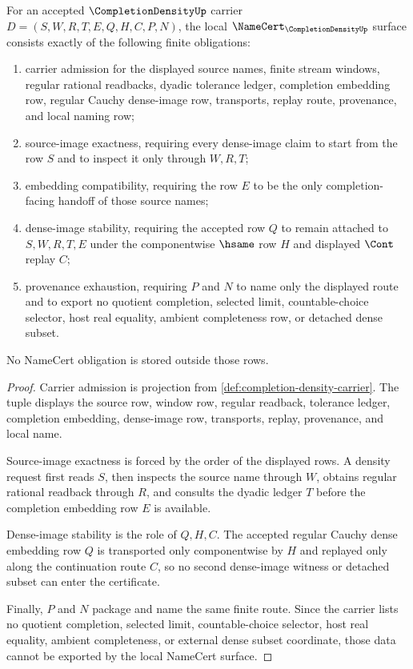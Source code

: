 \begin{theorem}
\label{thm:completion-density-namecert-obligations}
For an accepted $\CompletionDensityUp$ carrier $D=(S,W,R,T,E,Q,H,C,P,N)$, the local $\NameCert_{\CompletionDensityUp}$ surface consists exactly of the following finite obligations:
\begin{enumerate}
\item carrier admission for the displayed source names, finite stream windows, regular rational readbacks, dyadic tolerance ledger, completion embedding row, regular Cauchy dense-image row, transports, replay route, provenance, and local naming row;
\item source-image exactness, requiring every dense-image claim to start from the row $S$ and to inspect it only through $W,R,T$;
\item embedding compatibility, requiring the row $E$ to be the only completion-facing handoff of those source names;
\item dense-image stability, requiring the accepted row $Q$ to remain attached to $S,W,R,T,E$ under the componentwise $\hsame$ row $H$ and displayed $\Cont$ replay $C$;
\item provenance exhaustion, requiring $P$ and $N$ to name only the displayed route and to export no quotient completion, selected limit, countable-choice selector, host real equality, ambient completeness row, or detached dense subset.
\end{enumerate}
No NameCert obligation is stored outside those rows.
\end{theorem}
\begin{proof}
Carrier admission is projection from \autoref{def:completion-density-carrier}. The tuple displays the source row, window row, regular readback, tolerance ledger, completion embedding, dense-image row, transports, replay, provenance, and local name.

Source-image exactness is forced by the order of the displayed rows. A density request first reads $S$, then inspects the source name through $W$, obtains regular rational readback through $R$, and consults the dyadic ledger $T$ before the completion embedding row $E$ is available.

Dense-image stability is the role of $Q,H,C$. The accepted regular Cauchy dense embedding row $Q$ is transported only componentwise by $H$ and replayed only along the continuation route $C$, so no second dense-image witness or detached subset can enter the certificate.

Finally, $P$ and $N$ package and name the same finite route. Since the carrier lists no quotient completion, selected limit, countable-choice selector, host real equality, ambient completeness, or external dense subset coordinate, those data cannot be exported by the local NameCert surface.
\end{proof}

